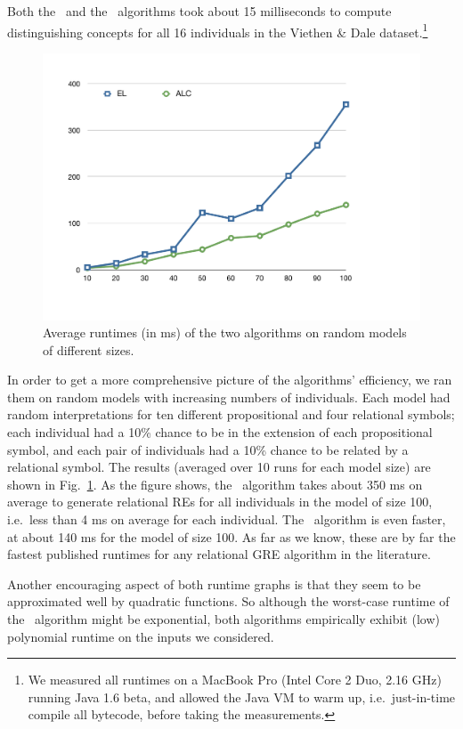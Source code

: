 Both the \el\ and the \alc\ algorithms took about 15 milliseconds to
compute distinguishing concepts for all 16 individuals in the Viethen
\& Dale dataset.\footnote{We measured all runtimes on a MacBook Pro
  (Intel Core 2 Duo, 2.16 GHz) running Java 1.6 beta, and allowed the
  Java VM to warm up, i.e.\ just-in-time compile all bytecode, before
  taking the measurements.}

\begin{figure}[t]
  \centering
  \includegraphics[width=\columnwidth]{runtimes}
  \caption{Average runtimes (in ms) of the two algorithms on random
    models of     different sizes.} 
  \label{fig:runtimes}
\end{figure}

In order to get a more comprehensive picture of the algorithms'
efficiency, we ran them on random models with increasing numbers of
individuals.  Each model had random interpretations for ten different
propositional and four relational symbols; each individual had a 10\%
chance to be in the extension of each propositional symbol, and each
pair of individuals had a 10\% chance to be related by a relational
symbol.  The results (averaged over 10 runs for each model size) are
shown in Fig.~\ref{fig:runtimes}.  As the figure shows, the \el\
algorithm takes about 350 ms on average to generate relational REs for
all individuals in the model of size 100, i.e.\ less than 4 ms on
average for each individual.  The \alc\ algorithm is even faster, at
about 140 ms for the model of size 100.  As far as we know, these are
by far the fastest published runtimes for any relational GRE algorithm
in the literature.

Another encouraging aspect of both runtime graphs is that they seem to
be approximated well by quadratic functions.  So although the
worst-case runtime of the \el\ algorithm might be exponential, both
algorithms empirically exhibit (low) polynomial runtime on the inputs
we considered.



